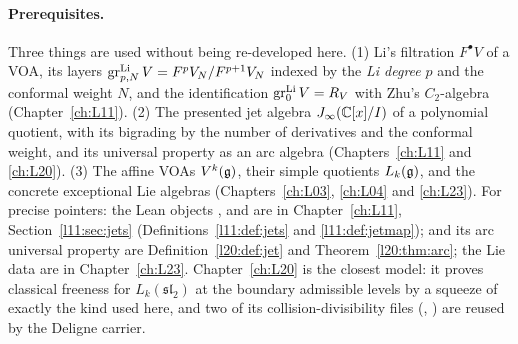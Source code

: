 \paragraph{Prerequisites.} Three things are used without being re-developed here.
(1) Li's filtration $F^\bullet V$ of a VOA, its layers $\operatorname{gr}^{\mathrm{Li}}_{p,N}V=F^pV_N/F^{p+1}V_N$ indexed by
the \emph{Li degree} $p$ and the conformal weight $N$, and the identification $\operatorname{gr}^{\mathrm{Li}}_0V=R_V$ with
Zhu's $C_2$-algebra (Chapter~\ref{ch:L11}). (2) The presented jet algebra $J_\infty({\mathbb{C}}[x]/I)$ of a
polynomial quotient, with its bigrading by the number of derivatives and the conformal weight, and its universal
property as an arc algebra (Chapters~\ref{ch:L11} and \ref{ch:L20}). (3) The affine VOAs $V^k(\mathfrak g)$,
their simple quotients $L_k(\mathfrak g)$, and the concrete exceptional Lie algebras (Chapters~\ref{ch:L03},
\ref{ch:L04} and \ref{ch:L23}). For precise pointers: the Lean objects ,
 and  are in Chapter~\ref{ch:L11},
Section~\ref{l11:sec:jets} (Definitions~\ref{l11:def:jets} and \ref{l11:def:jetmap});
 and its arc universal property are Definition~\ref{l20:def:jet} and
Theorem~\ref{l20:thm:arc}; the Lie data  are in Chapter~\ref{ch:L23}. Chapter~\ref{ch:L20} is the
closest model: it proves classical freeness for $L_k(\mathfrak{sl}_2)$ at the boundary admissible levels by a
squeeze of exactly the kind used here, and two of its collision-divisibility files
(,
) are reused by the Deligne carrier.

